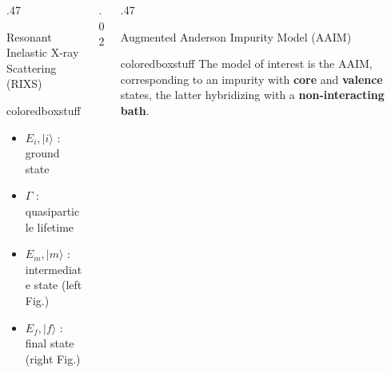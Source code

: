 \documentclass[final, hyperref={pdfpagelabels=false}]{beamer}
\begin{document}
\begin{frame}[t]
\begin{columns}[t]
\begin{column}{.47\textwidth}
\begin{block}{\color{ta2orange!0}Resonant Inelastic X-ray Scattering (RIXS)}
\begin{beamercolorbox}[wd=\textwidth]{coloredboxstuff}
\begin{minipage}{0.39\textwidth}
\begin{itemize}
\item $E_i, |i\rangle$ : ground state
\item $\Gamma$ : quasiparticle lifetime
\end{itemize}
\end{minipage}
\begin{minipage}{0.53\textwidth}
\begin{itemize}
\item $E_m, |m\rangle$ : intermediate state (left Fig.)
\item $E_f, |f\rangle$ : final state (right Fig.)
\end{itemize}
\end{minipage}
\end{beamercolorbox}
\end{block}
\end{column}

\begin{column}{.02\textwidth}
\end{column}	%
\begin{column}{.47\textwidth}
\begin{block}{\color{ta2orange!0} Augmented Anderson Impurity Model (AAIM)}
\begin{beamercolorbox}[wd=\textwidth]{coloredboxstuff}
The model of interest is the AAIM, corresponding to an impurity with \textcolor[rgb]{0.25,0.46,0.02}{\textbf{core}} and \textcolor[rgb]{0,0.32,0.69}{\textbf{valence}} states, the latter hybridizing with a \textcolor[rgb]{0.75,0.47,0}{\textbf{non-interacting bath}}.

\vspace{0.1em}

\begin{minipage}[c]{0.96\textwidth}
\centering



\begin{tikzpicture}[x=2.5pt,y=2.3pt,yscale=-1,xscale=1]


\end{tikzpicture}
\end{minipage}
\end{beamercolorbox}
\end{block}
\end{column}
\end{columns}
\end{frame}
\end{document}
